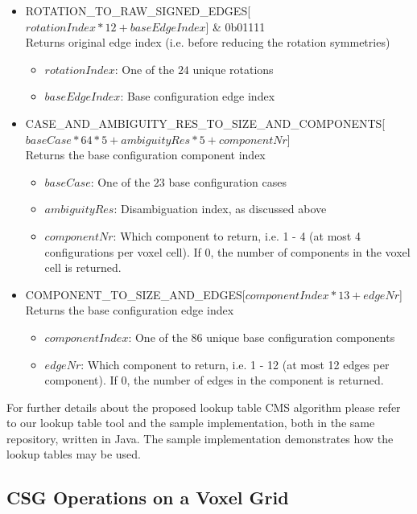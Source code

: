\begin{itemize}
	\item ROTATION\_TO\_RAW\_SIGNED\_EDGES[$rotationIndex * 12 + baseEdgeIndex$] \& 0b01111\\
	Returns original edge index (i.e. before reducing the rotation symmetries)
	\begin{itemize}
		\item $rotationIndex$: One of the $24$ unique rotations
		\item $baseEdgeIndex$: Base configuration edge index
  \end{itemize}
	
	\item CASE\_AND\_AMBIGUITY\_RES\_TO\_SIZE\_AND\_COMPONENTS[$baseCase * 64 * 5 + ambiguityRes * 5 + componentNr$]\\
	Returns the base configuration component index
	\begin{itemize}
		\item $baseCase$: One of the $23$ base configuration cases
		\item $ambiguityRes$: Disambiguation index, as discussed above
		\item $componentNr$: Which component to return, i.e. 1 - 4 (at most 4 configurations per voxel cell). If 0, the number of components in
		the voxel cell is returned.
  \end{itemize}

	\item COMPONENT\_TO\_SIZE\_AND\_EDGES[$componentIndex * 13 + edgeNr$]\\
	Returns the base configuration edge index
	\begin{itemize}
		\item $componentIndex$: One of the $86$ unique base configuration components
		\item $edgeNr$: Which component to return, i.e. 1 - 12 (at most 12 edges per component). If 0, the number of edges in
		the component is returned.
  \end{itemize}
	
\end{itemize}

For further details about the proposed lookup table CMS algorithm please refer to our lookup table tool and the sample implementation, both in the same repository, written in Java. The sample implementation demonstrates how the lookup tables may be used.


\subsection{CSG Operations on a Voxel Grid}

